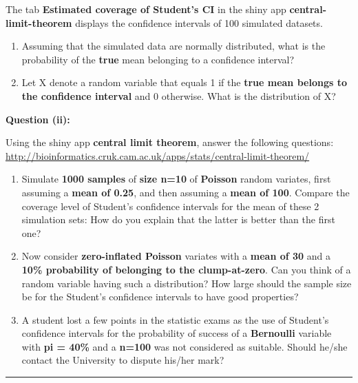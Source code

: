 \documentclass[]{article}
\providecommand{\tightlist}{%
  \setlength{\itemsep}{0pt}\setlength{\parskip}{0pt}}
\begin{document}
The tab \textbf{Estimated coverage of Student's CI} in the shiny app
\textbf{central-limit-theorem} displays the confidence intervals of 100
simulated datasets.

\begin{enumerate}
\def\labelenumi{\arabic{enumi}.}
\tightlist
\item
  Assuming that the simulated data are normally distributed, what is the
  probability of the \textbf{true} mean belonging to a confidence
  interval?
\item
  Let X denote a random variable that equals 1 if the \textbf{true mean
  belongs to the confidence interval} and 0 otherwise. What is the
  distribution of X?\\
\end{enumerate}

{\textbf{Question (ii):}}

Using the shiny app \textbf{central limit theorem}, answer the following
questions:
\url{http://bioinformatics.cruk.cam.ac.uk/apps/stats/central-limit-theorem/}

\begin{enumerate}
\def\labelenumi{\arabic{enumi}.}
\tightlist
\item
  Simulate \textbf{1000 samples} of \textbf{size n=10} of
  \textbf{Poisson} random variates, first assuming a \textbf{mean of
  0.25}, and then assuming a \textbf{mean of 100}. Compare the coverage
  level of Student's confidence intervals for the mean of these 2
  simulation sets: How do you explain that the latter is better than the
  first one?
\item
  Now consider \textbf{zero-inflated Poisson} variates with a
  \textbf{mean of 30} and a \textbf{10\% probability of belonging to the
  clump-at-zero}. Can you think of a random variable having such a
  distribution? How large should the sample size be for the Student's
  confidence intervals to have good properties?\\
\item
  A student lost a few points in the statistic exams as the use of
  Student's confidence intervals for the probability of success of a
  \textbf{Bernoulli} variable with \textbf{pi = 40\%} and a
  \textbf{n=100} was not considered as suitable. Should he/she contact
  the University to dispute his/her mark?
\end{enumerate}

\begin{center}\rule{0.5\linewidth}{\linethickness}\end{center}
\end{document}
